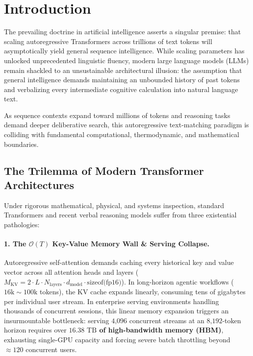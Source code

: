 \section{Introduction}
\label{sec:intro}

The prevailing doctrine in artificial intelligence asserts a singular premise: that scaling autoregressive Transformers \citep{vaswani2017attention} across trillions of text tokens will asymptotically yield general sequence intelligence. 
While scaling parameters has unlocked unprecedented linguistic fluency, modern large language models (LLMs) remain shackled to an unsustainable architectural illusion: the assumption that general intelligence demands maintaining an unbounded history of past tokens and verbalizing every intermediate cognitive calculation into natural language text.

As sequence contexts expand toward millions of tokens and reasoning tasks demand deeper deliberative search, this autoregressive text-matching paradigm is colliding with fundamental computational, thermodynamic, and mathematical boundaries.

\subsection{The Trilemma of Modern Transformer Architectures}

Under rigorous mathematical, physical, and systems inspection, standard Transformers and recent verbal reasoning models suffer from three existential pathologies:

\paragraph{1. The $\mathcal{O}(T)$ Key-Value Memory Wall \& Serving Collapse.}
Autoregressive self-attention demands caching every historical key and value vector across all attention heads and layers ($M_{\text{KV}} = 2 \cdot L \cdot N_{\text{layers}} \cdot d_{\text{model}} \cdot \text{sizeof(fp16)}$). 
In long-horizon agentic workflows ($16\text{k} \sim 100\text{k}$ tokens), the KV cache expands linearly, consuming tens of gigabytes per individual user stream. 
In enterprise serving environments handling thousands of concurrent sessions, this linear memory expansion triggers an insurmountable bottleneck: serving $4\text{,}096$ concurrent streams at an $8\text{,}192$-token horizon requires over \textbf{$16.38\text{ TB}$ of high-bandwidth memory (HBM)}, exhausting single-GPU capacity and forcing severe batch throttling beyond $\approx 120$ concurrent users.

